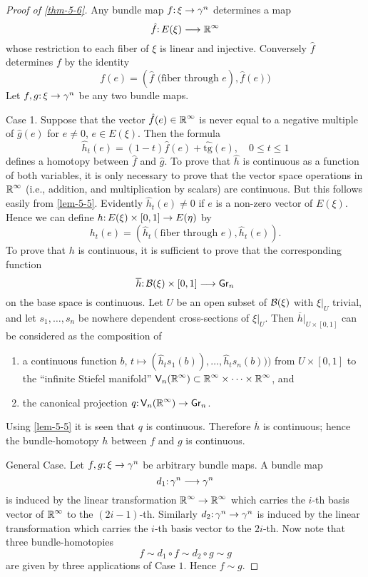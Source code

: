 \begin{proof}[Proof of \cref{thm-5-6}]
	Any bundle map $\map{f}{\xi}{\gamma^{n}} $ determines a map
\[
	\map{\hat{f}}{E(\xi)}{\R^{\infty}}\]
	whose restriction to each fiber of $\xi$ is linear and injective. Conversely $\hat{f}$ determines $f$ by the identity
	\[
	f(e)=(\hat{f} \text { (fiber through } e), \hat{f}(e))
	\]
	Let $\map{f, g}{\xi}{\gamma^{n}}$ be any two bundle maps.
	
	Case 1. Suppose that the vector $\hat{f}(e) \in \boldsymbol{\mathbb{R}}^{\infty}$ is never equal to a negative multiple of $\hat{g}(e)$ for $e \neq 0$, $e \in E(\xi)$. Then the formula
	\[
	\hat{h}_{t}(e)=(1-t) \hat{f}(e)+\hat{\mathrm{tg}}(e), \quad 0 \leq t \leq 1
	\]
defines a homotopy between $\hat{f}$ and $\hat{g}$. To prove that $\hat{h}$ is continuous as a function of both variables, it is only necessary to prove that the vector space operations in $\boldsymbol{\mathbb{R}}^{\infty}$ (i.e., addition, and multiplication by scalars) are continuous. But this follows easily from \cref{lem-5-5}. Evidently
$\hat{h}_t(e)\neq0$ if $e$ is a non-zero vector of $E(\xi)$. Hence we can define
$\map{h}{E(\xi)\times[0,1]}{E(\eta)}$ by
\[h_t(e)=(\hat{h}_t(\text{fiber through } e),\hat{h}_t(e)).\]
To prove that $h$ is continuous, it is sufficient to prove that the 
corresponding function
\[\map{\overline{h}}{\B (\xi)\times[0,1]}{\grass{n}{}}\]
on the base space is continuous. Let $U$ be an open subset of $\mathcal{B} (\xi)$ with $\xi|_{U}$ trivial, and let $s_1,\dots,s_n$ be nowhere dependent cross-sections of
$\xi|_{U}$. Then $\overline{h}|_{ U \times [0,1]}$ can be considered as the composition of
\begin{enumerate}[label=\arabic*),leftmargin=2\parindent ]
	\item a continuous function $b$, $t\mapsto (\hat{h}_ts_1(b)),\dots, \hat{h}_ts_n(b)))$ from $U \times [0,1]$
	to the ``infinite Stiefel manifold'' $\stiefel{n}{}{\infty} \subset \R^\infty \times \dots \times \R^\infty$, and
	\item the canonical projection $\map{q}{\stiefel{n}{}{\infty}}{\grass{n}{}}$.
\end{enumerate}
 Using \cref{lem-5-5} it is seen that $q$ is continuous. Therefore $\overline{h}$ is continuous;
hence the bundle-homotopy $h$ between $f$ and $g$ is continuous.

General Case. Let $\map{f, g}{\xi}{\gamma^n}$ be arbitrary bundle maps. A bundle
map
\[\map{d_1}{\gamma^n}{\gamma^n}\]
is induced by the linear transformation $\boldsymbol{\mathbb{R}}^\infty\to \boldsymbol{\mathbb{R}}^\infty$ which carries the $i$-th
basis vector of $\boldsymbol{\mathbb{R}}^\infty$ to the $(2i-1)$-th. Similarly $\map{d_2}{\gamma^n}{\gamma^n}$ is induced
by the linear transformation which carries the $i$-th basis vector to the
$2i$-th. Now note that three bundle-homotopies
\[f\sim d_1\circ f\sim d_2\circ g\sim g\]
are given by three applications of Case $1$. Hence $f\sim
g$. 
\end{proof} 


